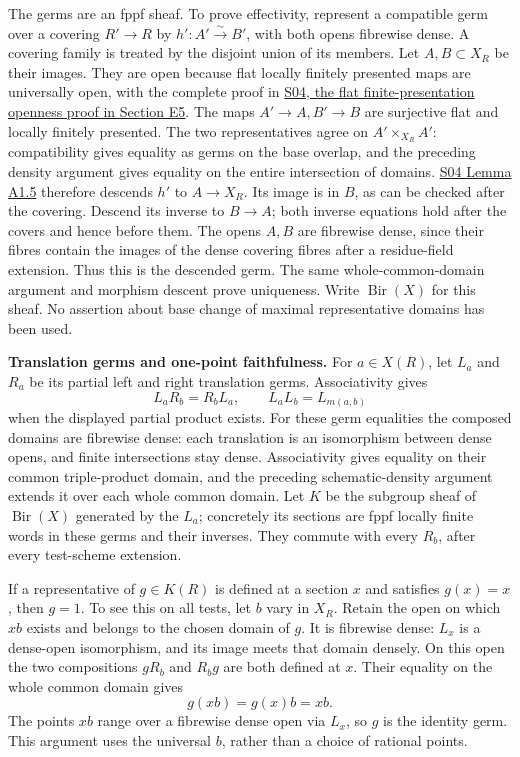 \documentclass[11pt,a4paper,openany]{report}
\begin{document}
The germs are an fppf sheaf. To prove effectivity, represent a compatible germ over a covering \(R'\to R\) by \(h':A'\xrightarrow{\sim}B'\), with both opens fibrewise dense. A covering family is treated by the disjoint union of its members. Let \(A,B\subset X_R\) be their images. They are open because flat locally finitely presented maps are universally open, with the complete proof in \href{https://github.com/KokunoYumeto/open-math-courses/blob/main/docs/courses/AG-RG/AG-RG-S04.md}{S04, the flat finite-presentation openness proof in Section E5}. The maps \(A'\to A,B'\to B\) are surjective flat and locally finitely presented. The two representatives agree on \(A'\times_{X_R}A'\): compatibility gives equality as germs on the base overlap, and the preceding density argument gives equality on the entire intersection of domains. \href{https://github.com/KokunoYumeto/open-math-courses/blob/main/docs/courses/AG-RG/AG-RG-S04.md}{S04 Lemma A1.5} therefore descends \(h'\) to \(A\to X_R\). Its image is in \(B\), as can be checked after the covering. Descend its inverse to \(B\to A\); both inverse equations hold after the covers and hence before them. The opens \(A,B\) are fibrewise dense, since their fibres contain the images of the dense covering fibres after a residue-field extension. Thus this is the descended germ. The same whole-common-domain argument and morphism descent prove uniqueness. Write \(\operatorname{Bir}(X)\) for this sheaf. No assertion about base change of maximal representative domains has been used.

\textbf{Translation germs and one-point faithfulness.} For \(a\in X(R)\), let \(L_a\) and \(R_a\) be its partial left and right translation germs. Associativity gives \[
L_aR_b=R_bL_a,\qquad L_aL_b=L_{m(a,b)}
\] when the displayed partial product exists. For these germ equalities the composed domains are fibrewise dense: each translation is an isomorphism between dense opens, and finite intersections stay dense. Associativity gives equality on their common triple-product domain, and the preceding schematic-density argument extends it over each whole common domain. Let \(K\) be the subgroup sheaf of \(\operatorname{Bir}(X)\) generated by the \(L_a\); concretely its sections are fppf locally finite words in these germs and their inverses. They commute with every \(R_b\), after every test-scheme extension.

If a representative of \(g\in K(R)\) is defined at a section \(x\) and satisfies \(g(x)=x\), then \(g=1\). To see this on all tests, let \(b\) vary in \(X_R\). Retain the open on which \(xb\) exists and belongs to the chosen domain of \(g\). It is fibrewise dense: \(L_x\) is a dense-open isomorphism, and its image meets that domain densely. On this open the two compositions \(gR_b\) and \(R_bg\) are both defined at \(x\). Their equality on the whole common domain gives \[
g(xb)=g(x)b=xb.
\] The points \(xb\) range over a fibrewise dense open via \(L_x\), so \(g\) is the identity germ. This argument uses the universal \(b\), rather than a choice of rational points.
\end{document}
